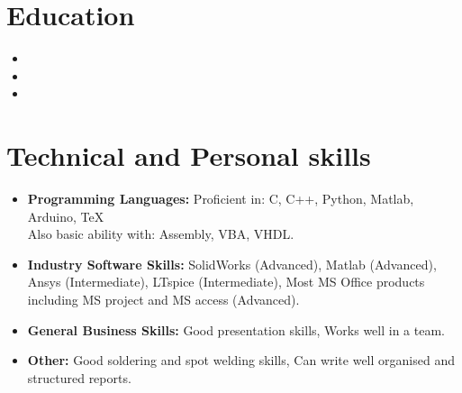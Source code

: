 \documentclass[11pt,a4paper,roman]{moderncv}        %
\begin{document}
\vspace{-30pt}

\section{Education}

\vspace{5pt}

\begin{itemize}

\item{}

\item{}  %

\item{}

\end{itemize}

\vspace{2pt}

\section{Technical and Personal skills}

\vspace{6pt}

\begin{itemize}

\item \textbf{Programming Languages:} Proficient in: C, C++, Python, Matlab, Arduino, TeX \\ Also basic ability with: Assembly, VBA, VHDL.

\vspace{6pt}

\item \textbf{Industry Software Skills:} SolidWorks (Advanced), Matlab (Advanced), Ansys (Intermediate),  LTspice (Intermediate), Most MS Office products including MS project and MS access (Advanced).

\vspace{6pt}

\item \textbf{General Business Skills:} Good presentation skills, Works well in a team.

\vspace{6pt}

\item \textbf{Other:} Good soldering and spot welding skills, Can write well organised and structured reports.

\end{itemize}
\end{document}
